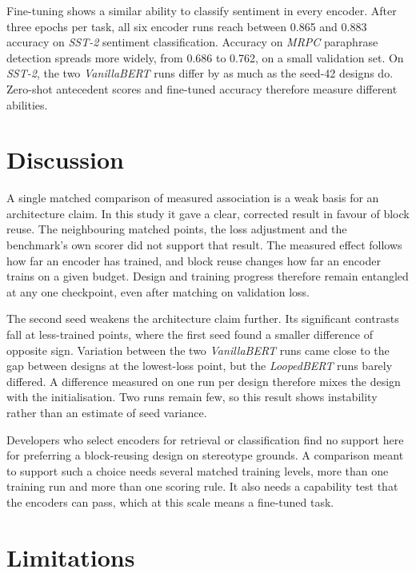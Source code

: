 \documentclass[sigconf,natbib=true]{acmart}
\begin{document}
Fine-tuning shows a similar ability to classify sentiment in every encoder. After three epochs
per task, all six encoder runs reach between 0.865 and 0.883 accuracy on
\emph{SST-2} sentiment classification. Accuracy on \emph{MRPC} paraphrase
detection spreads more widely, from 0.686 to 0.762, on a small validation set.
On \emph{SST-2}, the two \emph{VanillaBERT} runs differ by as much as the
seed-42 designs do. Zero-shot antecedent scores and fine-tuned accuracy therefore
measure different abilities.

\section{Discussion}
\label{sec:discussion}

A single matched comparison of measured association is a weak basis for an
architecture claim. In this study it gave a clear, corrected result in favour of
block reuse. The neighbouring matched points, the loss adjustment and the
benchmark's own scorer did not support that result. The measured effect follows
how far an encoder has trained, and block reuse changes how far an encoder
trains on a given budget. Design and training progress therefore remain
entangled at any one checkpoint, even after matching on validation loss.

The second seed weakens the architecture claim further. Its significant contrasts
fall at less-trained points, where the first seed found a smaller difference of
opposite sign. Variation between the two \emph{VanillaBERT} runs came close to the
gap between designs at the lowest-loss point, but the \emph{LoopedBERT} runs
barely differed. A difference measured on one run per design
therefore mixes the design with the initialisation. Two runs remain few, so this
result shows instability rather than an estimate of seed variance.

Developers who select encoders for retrieval or classification find no support
here for preferring a block-reusing design on stereotype grounds. A comparison
meant to support such a choice needs several matched training levels, more than
one training run and more than one scoring rule. It also needs a capability test
that the encoders can pass, which at this scale means a fine-tuned task.

\section{Limitations}
\label{sec:limits}
\end{document}
